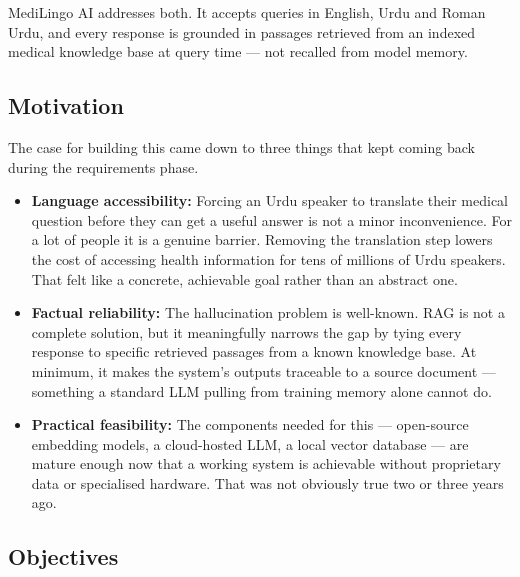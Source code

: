 MediLingo AI addresses both. It accepts queries in English, Urdu and Roman Urdu, and every
response is grounded in passages retrieved from an indexed medical knowledge base at query
time --- not recalled from model memory.

\subsection{Motivation}

The case for building this came down to three things that kept coming back during the
requirements phase.

\begin{itemize}
  \item \textbf{Language accessibility:} Forcing an Urdu speaker to translate their medical
        question before they can get a useful answer is not a minor inconvenience. For a lot
        of people it is a genuine barrier. Removing the translation step lowers the cost of
        accessing health information for tens of millions of Urdu speakers. That felt like
        a concrete, achievable goal rather than an abstract one.

  \item \textbf{Factual reliability:} The hallucination problem is well-known. RAG is not
        a complete solution, but it meaningfully narrows the gap by tying every response
        to specific retrieved passages from a known knowledge base. At minimum, it makes
        the system's outputs traceable to a source document --- something a standard LLM
        pulling from training memory alone cannot do.

  \item \textbf{Practical feasibility:} The components needed for this --- open-source
        embedding models, a cloud-hosted LLM, a local vector database --- are mature enough
        now that a working system is achievable without proprietary data or specialised
        hardware. That was not obviously true two or three years ago.
\end{itemize}

\subsection{Objectives}


